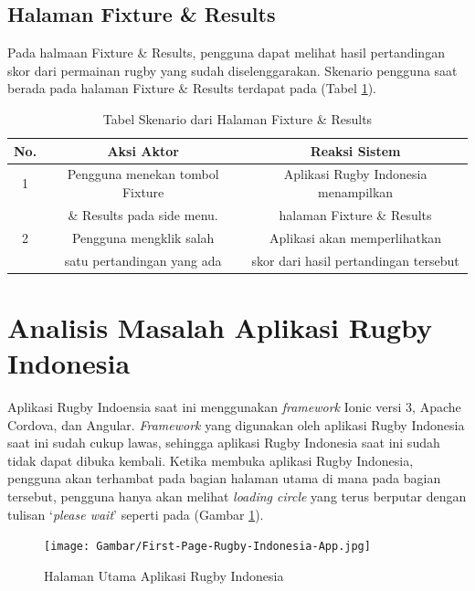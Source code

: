 \subsection{Halaman Fixture \& Results}
Pada halmaan Fixture \& Results, pengguna dapat melihat hasil pertandingan skor dari permainan rugby yang sudah diselenggarakan. Skenario pengguna saat berada pada halaman Fixture \& Results terdapat pada (Tabel \ref{tab:existing-scenario-fixture-results-page}).

\begin{table} [!h]
    \centering
    \caption{Tabel Skenario dari Halaman Fixture \& Results}
    \begin{tabular}{|c|c|c|}
    \hline
       No. & Aksi Aktor & Reaksi Sistem  \\ \hline
        1 & Pengguna menekan tombol Fixture & Aplikasi Rugby Indonesia menampilkan \\
         & \& Results pada side menu. & halaman Fixture \& Results \\ \hline
        2 & Pengguna mengklik salah & Aplikasi akan memperlihatkan \\ 
         & satu pertandingan yang ada & skor dari hasil pertandingan tersebut \\ \hline
    \end{tabular}
    \label{tab:existing-scenario-fixture-results-page}
\end{table}

\section{Analisis Masalah Aplikasi Rugby Indonesia}

Aplikasi Rugby Indoensia saat ini menggunakan \textit{framework} Ionic versi 3, Apache Cordova, dan Angular. \textit{Framework} yang digunakan oleh aplikasi Rugby Indonesia saat ini sudah cukup lawas, sehingga aplikasi Rugby Indonesia saat ini sudah tidak dapat dibuka kembali. Ketika membuka aplikasi Rugby Indonesia, pengguna akan terhambat pada bagian halaman utama di mana pada bagian tersebut, pengguna hanya akan melihat \textit{loading circle} yang terus berputar dengan tulisan `\textit{please wait}' seperti pada (Gambar \ref{fig:first-page-rugby-indonesia-app}).

\begin{figure} [H]
    \centering
    \texttt{[image: Gambar/First-Page-Rugby-Indonesia-App.jpg]}
    \caption{Halaman Utama Aplikasi Rugby Indonesia}
    \label{fig:first-page-rugby-indonesia-app}
\end{figure}


